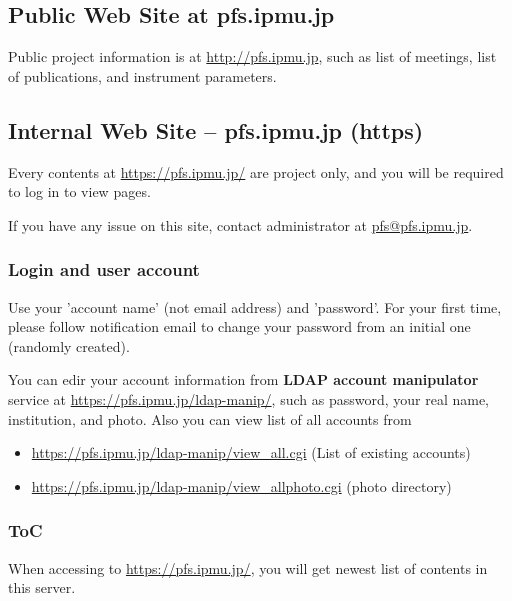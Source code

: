 \documentclass[a4paper,notitlepage]{article}
\begin{document}
\subsection{Public Web Site at pfs.ipmu.jp}

Public project information is at \url{http://pfs.ipmu.jp}, 
such as list of meetings, list of publications, and instrument parameters. 

\subsection{Internal Web Site -- pfs.ipmu.jp (https)}

Every contents at \url{https://pfs.ipmu.jp/} are project only, and you will 
be required to log in to view pages. 

If you have any issue on this site, contact administrator 
at \url{pfs@pfs.ipmu.jp}. 

\subsubsection{Login and user account}

Use your 'account name' (not email address) and 'password'.
For your first time, please follow notification email to change your password 
from an initial one (randomly created). 

You can edir your account information from {\bf LDAP account manipulator} 
service at \url{https://pfs.ipmu.jp/ldap-manip/}, 
such as password, your real name, institution, and photo. 
Also you can view list of all accounts from 

\begin{itemize}
  \item \url{https://pfs.ipmu.jp/ldap-manip/view_all.cgi} (List of existing accounts)
  \item \url{https://pfs.ipmu.jp/ldap-manip/view_allphoto.cgi} (photo directory)
\end{itemize}

\subsubsection{ToC}

When accessing to \url{https://pfs.ipmu.jp/}, you will get newest list of 
contents in this server. 
\end{document}
